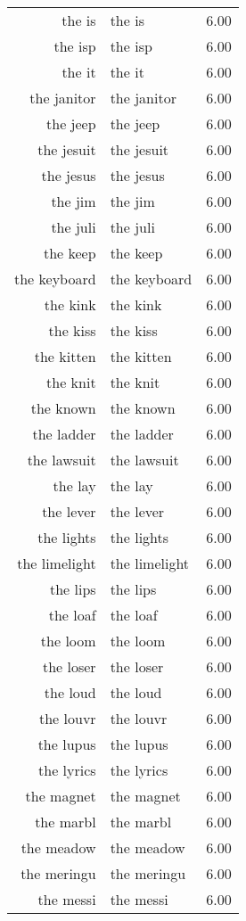 \begin{table}[ht]
\begin{tabular}{rlr}
  the is & the is & 6.00 \\ 
  the isp & the isp & 6.00 \\ 
  the it & the it & 6.00 \\ 
  the janitor & the janitor & 6.00 \\ 
  the jeep & the jeep & 6.00 \\ 
  the jesuit & the jesuit & 6.00 \\ 
  the jesus & the jesus & 6.00 \\ 
  the jim & the jim & 6.00 \\ 
  the juli & the juli & 6.00 \\ 
  the keep & the keep & 6.00 \\ 
  the keyboard & the keyboard & 6.00 \\ 
  the kink & the kink & 6.00 \\ 
  the kiss & the kiss & 6.00 \\ 
  the kitten & the kitten & 6.00 \\ 
  the knit & the knit & 6.00 \\ 
  the known & the known & 6.00 \\ 
  the ladder & the ladder & 6.00 \\ 
  the lawsuit & the lawsuit & 6.00 \\ 
  the lay & the lay & 6.00 \\ 
  the lever & the lever & 6.00 \\ 
  the lights & the lights & 6.00 \\ 
  the limelight & the limelight & 6.00 \\ 
  the lips & the lips & 6.00 \\ 
  the loaf & the loaf & 6.00 \\ 
  the loom & the loom & 6.00 \\ 
  the loser & the loser & 6.00 \\ 
  the loud & the loud & 6.00 \\ 
  the louvr & the louvr & 6.00 \\ 
  the lupus & the lupus & 6.00 \\ 
  the lyrics & the lyrics & 6.00 \\ 
  the magnet & the magnet & 6.00 \\ 
  the marbl & the marbl & 6.00 \\ 
  the meadow & the meadow & 6.00 \\ 
  the meringu & the meringu & 6.00 \\ 
  the messi & the messi & 6.00 \\ 

\end{tabular}
\end{table}

